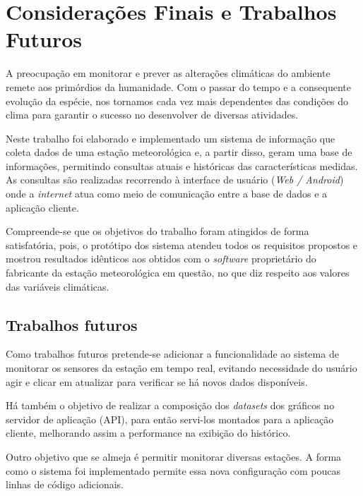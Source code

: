 \chapter{Considerações Finais e Trabalhos Futuros}


A preocupação em monitorar e prever as alterações climáticas do ambiente remete aos primórdios da humanidade. Com o passar do tempo e a consequente evolução da espécie, nos tornamos cada vez mais dependentes das condições do clima para garantir o sucesso no desenvolver de diversas atividades.

Neste trabalho foi elaborado e implementado um sistema de informação que coleta dados de uma estação meteorológica e, a partir disso, geram uma base de informações, permitindo consultas atuais e históricas das características medidas. As consultas são realizadas recorrendo à interface de usuário (\textit{Web / Android}) onde a \textit{internet} atua como meio de comunicação entre a base de dados e a aplicação cliente.

Compreende-se que os objetivos do trabalho foram atingidos de forma satisfatória, pois, o protótipo dos sistema atendeu todos os requisitos propostos e mostrou resultados idênticos aos obtidos com o \textit{software} proprietário do fabricante da estação meteorológica em questão, no que diz respeito aos valores das variáveis climáticas.
 
\section{Trabalhos futuros}

Como trabalhos futuros pretende-se adicionar a funcionalidade ao sistema de monitorar os sensores da estação em tempo real, evitando necessidade do usuário agir e clicar em atualizar para verificar se há novos dados disponíveis.

Há também o objetivo de realizar a composição dos \textit{datasets} dos gráficos no servidor de aplicação (API), para então servi-los montados para a aplicação cliente,  melhorando assim a performance na exibição do histórico. 

Outro objetivo que se almeja é permitir monitorar diversas estações. A forma como o sistema foi implementado permite essa nova configuração com poucas linhas de código adicionais.
